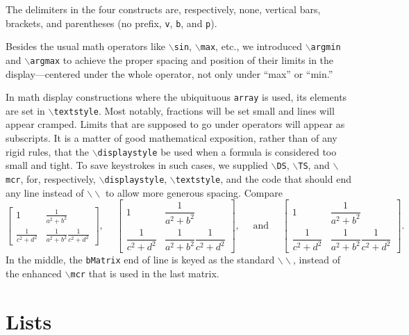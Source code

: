 \documentclass[ijds,nonblindrev]{informs4}
\begin{document}
The delimiters in the four constructs are, respectively, none, vertical 
bars, brackets, and parentheses (no prefix, \texttt{v}, \texttt{b}, 
and \texttt{p}).

Besides the usual math operators like \texttt{$\backslash $sin},
\texttt{$\backslash $max}, etc., we introduced \texttt{$\backslash
$argmin} and \texttt{$\backslash $argmax} to achieve the proper spacing and 
position of their limits in the display---centered under the whole operator, 
not only under ``max'' or ``min.''

In math display constructions where the ubiquituous \texttt{array} is 
used, its elements are set in \texttt{$\backslash $textstyle}. Most 
notably, fractions will be set small and lines will appear cramped. Limits 
that are supposed to go under operators will appear as subscripts. It is a 
matter of good mathematical exposition, rather than of any rigid rules, that 
the \texttt{$\backslash $displaystyle} be used when a formula is 
considered too small and tight. To save keystrokes in such cases, we 
supplied \texttt{$\backslash $DS}, \texttt{$\backslash $TS}, and
\texttt{$\backslash $mcr}, for, respectively, \texttt{$\backslash  
$displaystyle}, \texttt{$\backslash $textstyle}, and the code that 
should end any line instead of \texttt{$\backslash \backslash $} to 
allow more generous spacing. Compare
\begin{equation*}
\begin{bmatrix}
1&\tfrac{1}{a^2+b^2}\\
\tfrac{1}{c^2+d^2}&\tfrac{1}{a^2+b^2}\tfrac{1}{c^2+d^2}
\end{bmatrix},\quad\
\begin{bmatrix}
1&\dfrac{1}{a^2+b^2}\\
\dfrac{1}{c^2+d^2}&\dfrac{1}{a^2+b^2}\dfrac{1}{c^2+d^2}
\end{bmatrix},\quad \mbox{ and }\quad
\begin{bmatrix}
1&\dfrac{1}{a^2+b^2}\\[8pt]
\dfrac{1}{c^2+d^2}&\dfrac{1}{a^2+b^2}\dfrac{1}{c^2+d^2}
\end{bmatrix}.
\end{equation*}
In the middle, the \texttt{bMatrix} end of line is keyed as the standard 
\texttt{$\backslash \backslash $}, instead of the enhanced
\texttt{$\backslash $mcr} that is used in the last matrix. 

\section{Lists}\label{sec6}
\end{document}
